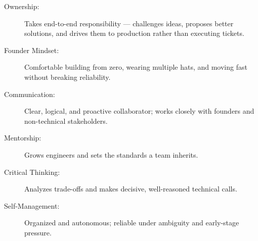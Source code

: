 
\begin{description}
    \item[Ownership:] Takes end-to-end responsibility — challenges ideas, proposes better solutions, and drives them to production rather than executing tickets.
    \item[Founder Mindset:] Comfortable building from zero, wearing multiple hats, and moving fast without breaking reliability.
    \item[Communication:] Clear, logical, and proactive collaborator; works closely with founders and non-technical stakeholders.
    \item[Mentorship:] Grows engineers and sets the standards a team inherits.
    \item[Critical Thinking:] Analyzes trade-offs and makes decisive, well-reasoned technical calls.
    \item[Self-Management:] Organized and autonomous; reliable under ambiguity and early-stage pressure.
\end{description}
